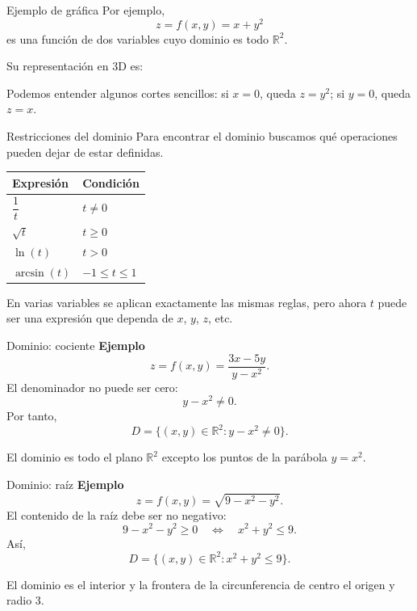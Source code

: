 \begin{frame}{Ejemplo de gráfica}
Por ejemplo,
\[
z=f(x,y)=x+y^2
\]
es una función de dos variables cuyo dominio es todo $\mathbb{R}^2$.
\medskip

Su representación en 3D es:

\small
Podemos entender algunos cortes sencillos: si $x=0$, queda $z=y^2$; si $y=0$, queda $z=x$.
\end{frame}

\begin{frame}{Restricciones del dominio}
Para encontrar el dominio buscamos qué operaciones pueden dejar de estar definidas.
\medskip

\begin{center}
\begin{tabular}{ll}
\textbf{Expresión} & \textbf{Condición} \\ \hline
$\dfrac{1}{t}$ & $t\neq 0$ \\[2mm]
$\sqrt{t}$ & $t\geq 0$ \\[2mm]
$\ln(t)$ & $t>0$ \\[2mm]
$\arcsin(t)$ & $-1\leq t\leq 1$
\end{tabular}
\end{center}
\medskip

En varias variables se aplican exactamente las mismas reglas, pero ahora $t$ puede ser una expresión que dependa de $x$, $y$, $z$, etc.
\end{frame}

\begin{frame}{Dominio: cociente}
\textbf{Ejemplo}
\[
z=f(x,y)=\frac{3x-5y}{y-x^2}.
\]
El denominador no puede ser cero:
\[
y-x^2\neq 0.
\]
Por tanto,
\[
D=\{(x,y)\in\mathbb{R}^2:y-x^2\ne0\}.
\]

\small
El dominio es todo el plano $\mathbb{R}^2$ excepto los puntos de la parábola $y=x^2$.
\end{frame}

\begin{frame}{Dominio: raíz}
\textbf{Ejemplo}
\[
z=f(x,y)=\sqrt{9-x^2-y^2}.
\]
El contenido de la raíz debe ser no negativo:
\[
9-x^2-y^2\geq 0
\quad\Longleftrightarrow\quad
x^2+y^2\leq 9.
\]
Así,
\[
D=\{(x,y)\in\mathbb{R}^2:x^2+y^2\leq9\}.
\]

\small
El dominio es el interior y la frontera de la circunferencia de centro el origen y radio $3$.
\end{frame}

